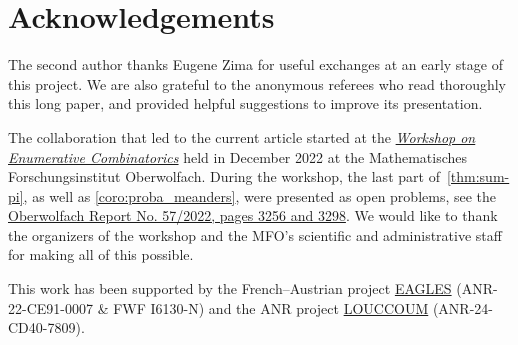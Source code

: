 \documentclass[12pt]{amsart}
\newcommand{\revision}[1]{{#1}}
\theoremstyle{plain}
\theoremstyle{remark}
\begin{document}
\section*{Acknowledgements}
The second author thanks Eugene Zima for useful exchanges at an early stage of this project. \revision{We are also grateful to the anonymous referees who read thoroughly this long paper, and provided helpful suggestions to improve its presentation.}

The collaboration that led to the current article started at the 
\href{https://www.mfo.de/occasion/2250}{\emph{Workshop on Enumerative Combinatorics}} held in December 2022 at the Mathematisches Forschungsinstitut Oberwolfach.
During the workshop, the last part of~\cref{thm:sum-pi}, as well as \cref{coro:proba_meanders}, were presented as open problems, see the \href{https://publications.mfo.de/bitstream/handle/mfo/4019/OWR_2022_57.pdf}{Oberwolfach Report No. 57/2022, pages 3256 and 3298}. We would like to thank the organizers of the workshop and the MFO's scientific and administrative staff for making all of this possible.

This work has been supported by the French--Austrian project 
\href{https://anr.fr/Project-ANR-22-CE91-0007}{EAGLES}
(ANR-22-CE91-0007 \& FWF I6130-N)
and the ANR project \href{https://anr-louccoum-anr-louccoum.apps.math.cnrs.fr/}{LOUCCOUM} (ANR-24-CD40-7809).


\end{document}
